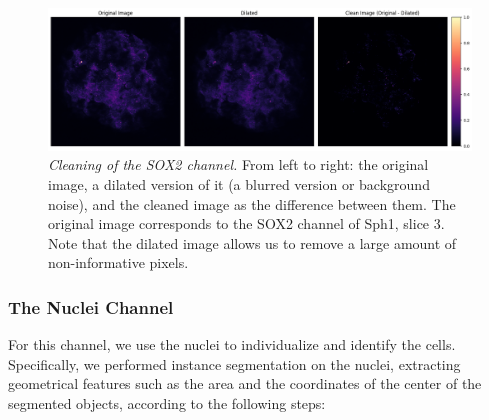 \documentclass[fleqn,10pt]{wlscirep}
\begin{document}
\begin{figure}[!ht]
    \centering
    \includegraphics[width=\linewidth]{images/sox2_cleaning_improved.png}
    \caption{\emph{Cleaning of the SOX2 channel.} From left to right: the original image, a dilated version of it (a blurred version or background noise), and the cleaned image as the difference between them. The original image corresponds to the SOX2 channel of \textsf{Sph1, slice 3}. Note that the dilated image allows us to remove a large amount of non-informative pixels.  }
    \label{fig: sox2 before and after}
\end{figure}


\subsubsection*{The Nuclei Channel}
For this channel, we use the nuclei to individualize and identify the cells. Specifically, we performed instance segmentation on the nuclei, extracting geometrical features such as the area and the coordinates of the center of the segmented objects, according to the following steps: 
\end{document}
